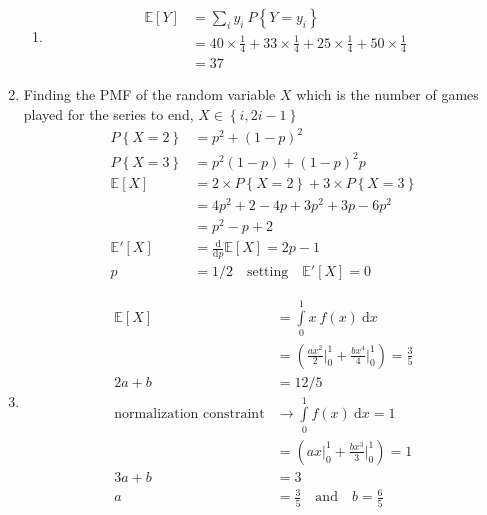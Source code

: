 \begin{enumerate}
\begin{enumerate}
			\item \begin{align}
				\mathbb{E}[Y] &= \sum\limits_{i} y_i\ P \left\{ Y = y_i \right\} \nonumber \\
				&= 40 \times \frac{1}{4} + 33 \times \frac{1}{4} + 25 \times \frac{1}{4} + 50 \times \frac{1}{4}\\
				&= 37
			\end{align}
			
		\end{enumerate}
	
	
	\item Finding the PMF of the random variable $ X $ which is the number of games played for the series to end, $ X \in \left\{i, 2i-1\right\} $\\
	
	
		\begin{align}
			P \left\{X = 2\right\} &= p^2 + (1-p)^2 \nonumber \\
			P \left\{X = 3\right\} &= p^2 (1-p) + (1-p)^2 p \nonumber \\
			\mathbb{E}[X] &= 2 \times P \left\{X = 2\right\} + 3 \times P \left\{X = 3\right\} \\
			&= 4p^2 + 2 - 4p + 3p^2 + 3p - 6p^2 \nonumber \\
			&= p^2 - p + 2 \nonumber \\
			\mathbb{E}'[X] &= \frac{\mathrm{d}}{\mathrm{d} p} \mathbb{E}[X] = 2p - 1 \\
			p &= 1/2 \quad \text{setting} \quad 	\mathbb{E}'[X] = 0			
		\end{align}
	
	
	\item 
		\begin{align}
			\mathbb{E}[X] &= \int\limits_{0}^{1} x\ f(x)\ \mathrm{d}x \nonumber \\
			&= \left( \frac{ax^2}{2} \Big|_0^1 + \frac{bx^4}{4}\Big|_0^1  \right) = \frac{3}{5} \nonumber \\
			2a + b &= 12/5 \\
			\text{normalization constraint} &\to  \int\limits_{0}^{1}  f(x)\ \mathrm{d}x = 1 \nonumber \\
			&= \left( ax \Big|_0^1 + \frac{bx^3}{3}\Big|_0^1  \right) = 1 \nonumber \\
			3a + b &= 3 \\
			a &= \frac{3}{5} \quad \text{and} \quad b = \frac{6}{5} 
		\end{align}
	

\end{enumerate}
